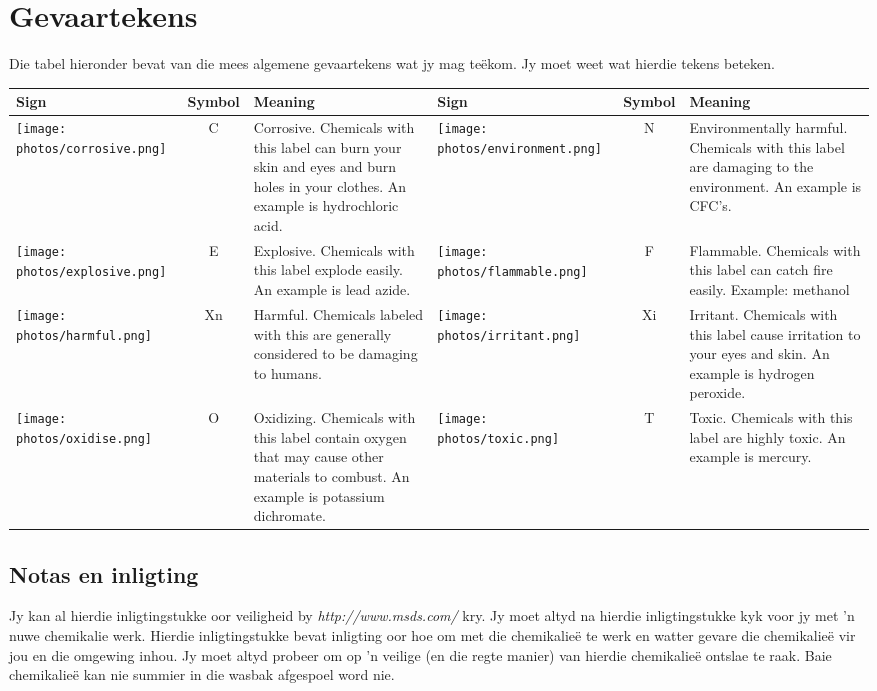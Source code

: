 \section{Gevaartekens}
            \nopagebreak
Die tabel hieronder bevat van die mees algemene gevaartekens wat jy mag teëkom. Jy moet weet wat hierdie tekens beteken.
\begin{table}[H]
 \begin{center}
  \begin{tabular}{|l|c|p{3cm}|l|c|p{3cm}|}\hline
   \textbf{Sign} & \textbf{Symbol} & \textbf{Meaning} & \textbf{Sign} & \textbf{Symbol} & \textbf{Meaning} \\ \hline
\parbox[c]{4em}{\texttt{[image: photos/corrosive.png]}} & C & Corrosive. Chemicals with this label can burn your skin and eyes and burn holes in your clothes. An example is hydrochloric acid. & \parbox[c]{4em}{\texttt{[image: photos/environment.png]}} & N & Environmentally harmful. Chemicals with this label are damaging to the environment. An example is CFC's. \\ \hline 
\parbox[c]{4em}{\texttt{[image: photos/explosive.png]}} & E & Explosive. Chemicals with this label explode easily. An example is lead azide. & \parbox[c]{4em}{\texttt{[image: photos/flammable.png]}} & F & Flammable. Chemicals with this label can catch fire easily. Example: methanol \\ \hline 
\parbox[c]{4em}{\texttt{[image: photos/harmful.png]}} & Xn & Harmful. Chemicals labeled with this are generally considered to be damaging to humans. & \parbox[c]{4em}{\texttt{[image: photos/irritant.png]}} & Xi & Irritant. Chemicals with this label cause irritation to your eyes and skin. An example is hydrogen peroxide. \\ \hline 
\parbox[c]{4em}{\texttt{[image: photos/oxidise.png]}} & O & Oxidizing. Chemicals with this label contain oxygen that may cause other materials to combust. An example is potassium dichromate. & \parbox[c]{4em}{\texttt{[image: photos/toxic.png]}} & T & Toxic. Chemicals with this label are highly toxic. An example is mercury. \\ \hline 
  \end{tabular}
 \end{center}
\end{table}
\subsection*{Notas en inligting}
Jy kan al hierdie inligtingstukke oor veiligheid by \textsl{http://www.msds.com/} kry. Jy moet altyd na hierdie inligtingstukke kyk voor jy met  'n nuwe chemikalie werk. Hierdie inligtingstukke bevat inligting oor hoe om met die chemikalieë te werk en watter gevare die chemikalieë vir jou en die omgewing inhou. Jy moet altyd probeer om op  'n veilige (en die regte manier) van hierdie chemikalieë ontslae te raak. Baie chemikalieë kan nie summier in die wasbak afgespoel word nie. 


